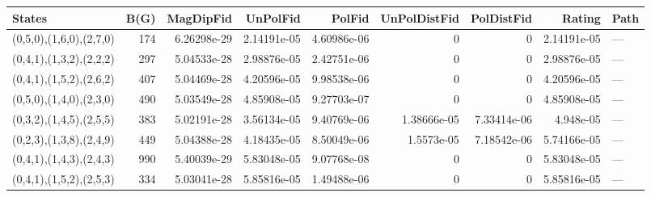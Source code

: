 \begin{tabular}{lrrrrrrrl}
\hline
 States                  &   B(G) &   MagDipFid &    UnPolFid &      PolFid &   UnPolDistFid &   PolDistFid &      Rating & Path   \\
\hline
 (0,5,0),(1,6,0),(2,7,0) &    174 & 6.26298e-29 & 2.14191e-05 & 4.60986e-06 &    0           &  0           & 2.14191e-05 & ---    \\
 (0,4,1),(1,3,2),(2,2,2) &    297 & 5.04533e-28 & 2.98876e-05 & 2.42751e-06 &    0           &  0           & 2.98876e-05 & ---    \\
 (0,4,1),(1,5,2),(2,6,2) &    407 & 5.04469e-28 & 4.20596e-05 & 9.98538e-06 &    0           &  0           & 4.20596e-05 & ---    \\
 (0,5,0),(1,4,0),(2,3,0) &    490 & 5.03549e-28 & 4.85908e-05 & 9.27703e-07 &    0           &  0           & 4.85908e-05 & ---    \\
 (0,3,2),(1,4,5),(2,5,5) &    383 & 5.02191e-28 & 3.56134e-05 & 9.40769e-06 &    1.38666e-05 &  7.33414e-06 & 4.948e-05   & ---    \\
 (0,2,3),(1,3,8),(2,4,9) &    449 & 5.04388e-28 & 4.18435e-05 & 8.50049e-06 &    1.5573e-05  &  7.18542e-06 & 5.74166e-05 & ---    \\
 (0,4,1),(1,4,3),(2,4,3) &    990 & 5.40039e-29 & 5.83048e-05 & 9.07768e-08 &    0           &  0           & 5.83048e-05 & ---    \\
 (0,4,1),(1,5,2),(2,5,3) &    334 & 5.03041e-28 & 5.85816e-05 & 1.49488e-06 &    0           &  0           & 5.85816e-05 & ---    \\
\hline
\end{tabular}